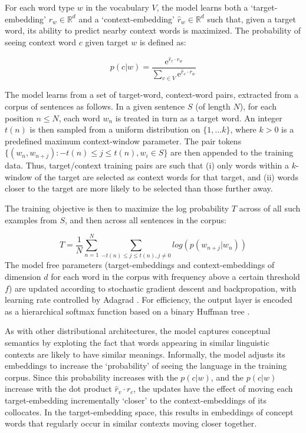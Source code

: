 \documentclass[11pt]{article}
\newcommand{\me}{\mathrm{e}}
\begin{document}
For each word type \(w\) in the vocabulary \(V\), the model learns both a `target-embedding' \( r_{w} \in \mathbb{R}^d\) and a `context-embedding' \(\hat{r}_{w} \in \mathbb{R}^d\) such that, given a target word, its ability to predict nearby context words is maximized. The probability of seeing context word \(c\) given target \(w\) is defined as:  

\[p(c|w)  = \frac{\me^{\hat{r}_{c} \cdot r_{w}}}{\sum_{v \in V} \me^{\hat{r}_v\cdot r_{w}}}    \] 

The model learns from a set of target-word, context-word pairs, extracted from a corpus of sentences as follows. In a given sentence \(S\) (of length \(N\)), for each position \( n \leq N\), each word \(w_n\) is treated in turn as a target word. An integer \( {t(n)} \) is then sampled from a uniform distribution on \( \{1, \dots k \} \), where \(k > 0\) is a predefined maximum context-window parameter. The pair tokens \( \{(w_n, w_{n+j}): -{t(n)}\leq j \leq {t(n)}, w_i \in S \}\) are then appended to the training data. Thus, target/context training pairs are such that (i) only words within a \(k\)-window of the target are selected as context words for that target, and (ii) words closer to the target are more likely to be selected than those further away.

The training objective is then to maximize the log probability \( T\) across of all such examples from \(S\), and then across all sentences in the corpus:
 
\[ T = \frac{1}{N} \sum_{n=1}^{N} \sum_{-{t(n)}\leq j \leq {t(n)}, j\neq 0} log(  p(w_{n+j}|w_{n}) ) \]The model free parameters (target-embeddings and context-embeddings of dimension \(d\) for each word in the corpus with frequency above a certain threshold \(f\)) are updated according to stochastic gradient descent and backpropation, with learning rate controlled by Adagrad \cite{duchi2011adaptive}. For efficiency, the output layer is encoded as a hierarchical softmax function based on a binary Huffman tree \cite{morin2005hierarchical}. 

As with other distributional architectures, the model captures conceptual semantics by exploting the fact that words appearing in similar linguistic contexts are likely to have similar meanings. Informally, the model adjusts its embeddings to increase the `probability' of seeing the language in the training corpus. Since this probability increases with the \(p(c|w)\), and the \(p(c|w)\) increase with the dot product \( \hat{r}_v\cdot r_{c} \), the updates have the effect of moving each target-embedding incrementally `closer' to the context-embeddings of its collocates. In the target-embedding space, this results in embeddings of concept words that regularly occur in similar contexts moving closer together.   
\end{document}
